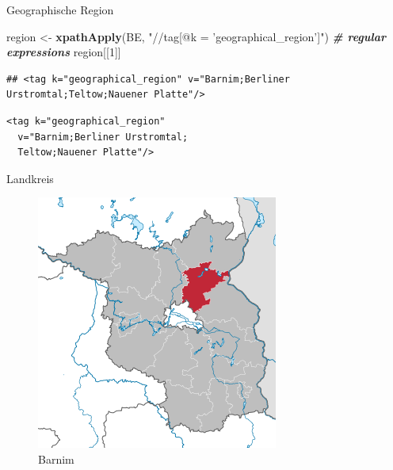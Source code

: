 \documentclass[ignorenonframetext,]{beamer}
\newenvironment{Shaded}{\begin{snugshade}}{\end{snugshade}}
\newcommand{\CommentTok}[1]{\textcolor[rgb]{0.00,0.40,1.00}{\textbf{\textit{#1}}}}
\newcommand{\DecValTok}[1]{\textcolor[rgb]{0.27,0.67,0.26}{#1}}
\newcommand{\KeywordTok}[1]{\textcolor[rgb]{0.26,0.66,0.93}{\textbf{#1}}}
\newcommand{\NormalTok}[1]{\textcolor[rgb]{0.74,0.68,0.62}{#1}}
\newcommand{\StringTok}[1]{\textcolor[rgb]{0.02,0.61,0.04}{#1}}
\begin{document}
\begin{frame}[fragile]{Geographische Region}
\protect\hypertarget{geographische-region}{}

\begin{Shaded}
\begin{Highlighting}[]
\NormalTok{region <-}\StringTok{ }\KeywordTok{xpathApply}\NormalTok{(BE,}
  \StringTok{"//tag[@k = 'geographical_region']"}\NormalTok{)}
\CommentTok{# regular expressions}
\NormalTok{region[[}\DecValTok{1}\NormalTok{]]}
\end{Highlighting}
\end{Shaded}

\begin{verbatim}
## <tag k="geographical_region" v="Barnim;Berliner Urstromtal;Teltow;Nauener Platte"/>
\end{verbatim}

\begin{verbatim}
<tag k="geographical_region" 
  v="Barnim;Berliner Urstromtal;
  Teltow;Nauener Platte"/>
\end{verbatim}

\end{frame}

\begin{frame}{Landkreis}
\protect\hypertarget{landkreis}{}

\begin{figure}
\centering
\includegraphics{figure/Barnim.png}
\caption{Barnim}
\end{figure}

\end{frame}
\end{document}
